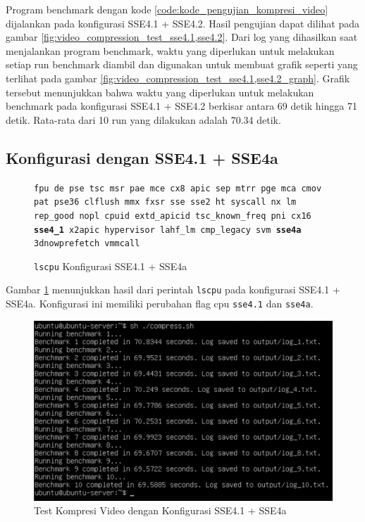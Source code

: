 Program benchmark dengan kode \ref{code:kode_pengujian_kompresi_video} dijalankan pada konfigurasi SSE4.1 + SSE4.2. Hasil pengujian dapat dilihat pada gambar \ref{fig:video_compression_test_sse4.1,sse4.2}. Dari log yang dihasilkan saat menjalankan program benchmark, waktu yang diperlukan untuk melakukan setiap run benchmark diambil dan digunakan untuk membuat grafik seperti yang terlihat pada gambar \ref{fig:video_compression_test_sse4.1,sse4.2_graph}. Grafik tersebut menunjukkan bahwa waktu yang diperlukan untuk melakukan benchmark pada konfigurasi SSE4.1 + SSE4.2 berkisar antara 69 detik hingga 71 detik. Rata-rata dari 10 run yang dilakukan adalah 70.34 detik.

\subsection{Konfigurasi dengan SSE4.1 + SSE4a}
\begin{figure}
    \texttt{fpu de pse tsc msr pae mce cx8 apic sep mtrr pge mca cmov pat pse36 clflush mmx fxsr sse sse2 ht syscall nx lm rep\_good nopl cpuid extd\_apicid tsc\_known\_freq pni cx16 \textbf{sse4\_1} x2apic hypervisor lahf\_lm cmp\_legacy svm \textbf{sse4a} 3dnowprefetch vmmcall}
    \caption{\texttt{lscpu} Konfigurasi SSE4.1 + SSE4a}
    \label{fig:lscpu_video_compression_test_sse4.1,sse4a}
\end{figure}

Gambar \ref{fig:lscpu_video_compression_test_sse4.1,sse4a} menunjukkan hasil dari perintah \texttt{lscpu} pada konfigurasi SSE4.1 + SSE4a. Konfigurasi ini memiliki perubahan flag cpu \texttt{sse4.1} dan \texttt{sse4a}.

\begin{figure}
    \centering
    \includegraphics[width=1\textwidth]
    {assets/pics/video-compression-test/sse4.1,sse4a.jpeg}
    \caption{Test Kompresi Video dengan Konfigurasi SSE4.1 + SSE4a}
    \label{fig:video_compression_test_sse4.1,sse4a}
\end{figure}

